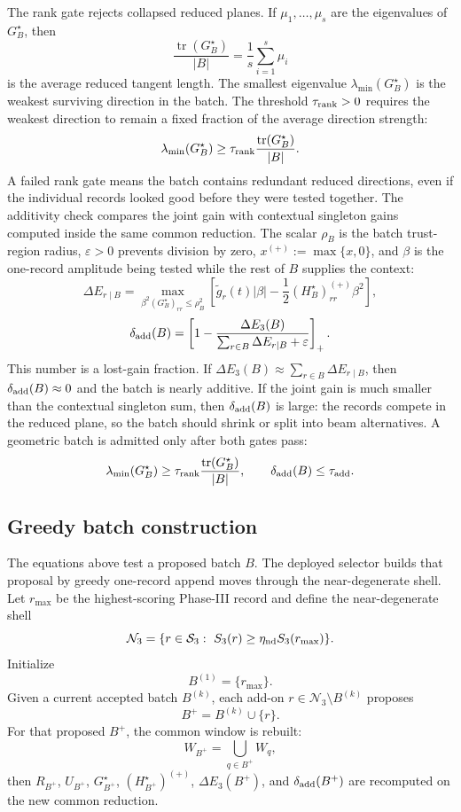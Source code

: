 \documentclass[10pt,twocolumn]{article}
\newcommand{\eps}{\varepsilon}
\begin{document}
The rank gate rejects collapsed reduced planes.  If \(\mu_1,\ldots,\mu_s\) are
the eigenvalues of \(G_B^\star\), then
\[
\frac{\operatorname{tr}(G_B^\star)}{|B|}
=\frac1s\sum_{i=1}^s\mu_i
\]
is the average reduced tangent length.  The smallest eigenvalue
\(\lambda_{\min}(G_B^\star)\) is the weakest surviving direction in the batch.
The threshold \(\tau_{\rm rank}>0\) requires the weakest direction to remain a
fixed fraction of the average direction strength:
\begin{equation}
\lambda_{\min}(G_B^\star)
\ge
\tau_{\rm rank}\frac{\operatorname{tr}(G_B^\star)}{|B|}.
\label{eq:p1_batch_rank_gate}
\end{equation}
A failed rank gate means the batch contains redundant reduced directions, even
if the individual records looked good before they were tested together.
The additivity check compares the joint gain with contextual singleton gains
computed inside the same common reduction.  The scalar \(\rho_B\) is the
batch trust-region radius, \(\eps>0\) prevents division by zero,
\(x^{(+)}:=\max\{x,0\}\), and \(\beta\) is the one-record amplitude being
tested while the rest of \(B\) supplies the context:
\begin{equation}
\Delta E_{r\mid B}
=
\max_{\beta^2(G_B^\star)_{rr}\le\rho_B^2}
\left[
\widetilde g_r(t)|\beta|
-\frac12(H_B^\star)_{rr}^{(+)}\beta^2
\right],
\label{eq:p1_batch_context_gain}
\end{equation}
\begin{equation}
\delta_{\rm add}(B)
=
\left[
1-\frac{\Delta E_3(B)}
{\sum_{r\in B}\Delta E_{r\mid B}+\eps}
\right]_+.
\label{eq:p1_batch_additivity}
\end{equation}
This number is a lost-gain fraction.  If
\(\Delta E_3(B)\approx\sum_{r\in B}\Delta E_{r\mid B}\), then
\(\delta_{\rm add}(B)\approx0\) and the batch is nearly additive.  If the joint
gain is much smaller than the contextual singleton sum, then
\(\delta_{\rm add}(B)\) is large: the records compete in the reduced plane, so
the batch should shrink or split into beam alternatives.  A geometric batch is
admitted only after both gates pass:
\[
\lambda_{\min}(G_B^\star)
\ge
\tau_{\rm rank}\frac{\operatorname{tr}(G_B^\star)}{|B|},
\qquad
\delta_{\rm add}(B)\le\tau_{\rm add}.
\]

\subsection{Greedy batch construction}

The equations above test a proposed batch \(B\).  The deployed selector builds
that proposal by greedy one-record append moves through the near-degenerate
shell.  Let \(r_{\max}\) be the highest-scoring Phase-III record and define the
near-degenerate shell
\[
\mathcal N_3
=\{r\in\mathcal S_3:\ S_3(r)\ge \eta_{\rm nd}S_3(r_{\max})\}.
\]
Initialize
\[
B^{(1)}=\{r_{\max}\}.
\]
Given a current accepted batch \(B^{(k)}\), each add-on \(r\in
\mathcal N_3\setminus B^{(k)}\) proposes
\[
B^+=B^{(k)}\cup\{r\}.
\]
For that proposed \(B^+\), the common window is rebuilt:
\[
W_{B^+}=\bigcup_{q\in B^+}W_q,
\]
then \(R_{B^+}\), \(U_{B^+}\), \(G_{B^+}^\star\),
\((H_{B^+}^\star)^{(+)}\), \(\Delta E_3(B^+)\), and
\(\delta_{\rm add}(B^+)\) are recomputed on the new common reduction.
\end{document}
